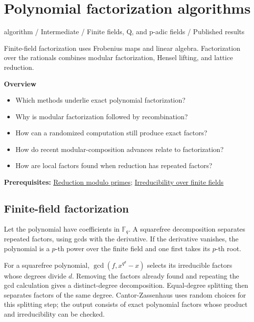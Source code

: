 \documentclass[11pt,a4paper,oneside,openany]{book}
\begin{document}
\chapter{Polynomial factorization algorithms}\label{article:factorization-algorithms}\hypertarget{article:factorization-algorithms}{}\color{black}
{\sffamily\small\color{atlasgold}algorithm / Intermediate / Finite fields, Q, and p-adic fields / Published results}\par\medskip
Finite-field factorization uses Frobenius maps and linear algebra. Factorization over the rationals combines modular factorization, Hensel lifting, and lattice reduction.\par\medskip
\textbf{Overview}\begin{itemize}
\item Which methods underlie exact polynomial factorization?
\item Why is modular factorization followed by recombination?
\item How can a randomized computation still produce exact factors?
\item How do recent modular-composition advances relate to factorization?
\item How are local factors found when reduction has repeated factors?
\end{itemize}
{\small\textbf{Prerequisites:} \hyperlink{article:modular-irreducibility}{Reduction modulo primes}; \hyperlink{article:finite-field-irreducibility}{Irreducibility over finite fields}}\par
{}\section{Finite-field factorization}
\color{black} Let the polynomial have coefficients in \(\mathbb F_q\). A squarefree decomposition separates repeated factors, using gcds with the derivative. If the derivative vanishes, the polynomial is a \(p\)-th power over the finite field and one first takes its \(p\)-th root.\par
\color{black} For a squarefree polynomial, \(\gcd(f,x^{q^d}-x)\) selects its irreducible factors whose degrees divide \(d\). Removing the factors already found and repeating the gcd calculation gives a distinct-degree decomposition. Equal-degree splitting then separates factors of the same degree. Cantor-Zassenhaus uses random choices for this splitting step; the output consists of exact polynomial factors whose product and irreducibility can be checked.\par
\end{document}

